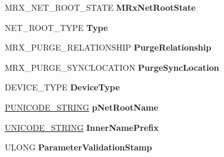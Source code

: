 \begin{DoxyCompactItemize}
\item 
\mbox{\label{struct___m_r_x___n_e_t___r_o_o_t___a8d81b83c1591074144940e2a1191841d}} 
M\+R\+X\+\_\+\+N\+E\+T\+\_\+\+R\+O\+O\+T\+\_\+\+S\+T\+A\+TE {\bfseries M\+Rx\+Net\+Root\+State}
\item 
\mbox{\label{struct___m_r_x___n_e_t___r_o_o_t___a61e44410959ddfe9c57bcf00ac67cd14}} 
N\+E\+T\+\_\+\+R\+O\+O\+T\+\_\+\+T\+Y\+PE {\bfseries Type}
\item 
\mbox{\label{struct___m_r_x___n_e_t___r_o_o_t___ad7b018ad4f4665224a4d96c149de0817}} 
M\+R\+X\+\_\+\+P\+U\+R\+G\+E\+\_\+\+R\+E\+L\+A\+T\+I\+O\+N\+S\+H\+IP {\bfseries Purge\+Relationship}
\item 
\mbox{\label{struct___m_r_x___n_e_t___r_o_o_t___aca421a6fbd479c07c7222230bf7b2e48}} 
M\+R\+X\+\_\+\+P\+U\+R\+G\+E\+\_\+\+S\+Y\+N\+C\+L\+O\+C\+A\+T\+I\+ON {\bfseries Purge\+Sync\+Location}
\item 
\mbox{\label{struct___m_r_x___n_e_t___r_o_o_t___a931027ce4e586194df8e431bf66807a3}} 
D\+E\+V\+I\+C\+E\+\_\+\+T\+Y\+PE {\bfseries Device\+Type}
\item 
\mbox{\label{struct___m_r_x___n_e_t___r_o_o_t___a5ffbc83db29f9900291b4c373175b766}} 
\hyperlink{struct___u_n_i_c_o_d_e___s_t_r_i_n_g}{P\+U\+N\+I\+C\+O\+D\+E\+\_\+\+S\+T\+R\+I\+NG} {\bfseries p\+Net\+Root\+Name}
\item 
\mbox{\label{struct___m_r_x___n_e_t___r_o_o_t___a1bf231e57c4fc999295880140160bac2}} 
\hyperlink{struct___u_n_i_c_o_d_e___s_t_r_i_n_g}{U\+N\+I\+C\+O\+D\+E\+\_\+\+S\+T\+R\+I\+NG} {\bfseries Inner\+Name\+Prefix}
\item 
\mbox{\label{struct___m_r_x___n_e_t___r_o_o_t___abb7a16127ce8dcd8b6fbe8f59f170178}} 
U\+L\+O\+NG {\bfseries Parameter\+Validation\+Stamp}
\item 
\mbox{\label{struct___m_r_x___n_e_t___r_o_o_t___a0bb406f74560e86367b5ee049cd21508}} 

\end{DoxyCompactItemize}
